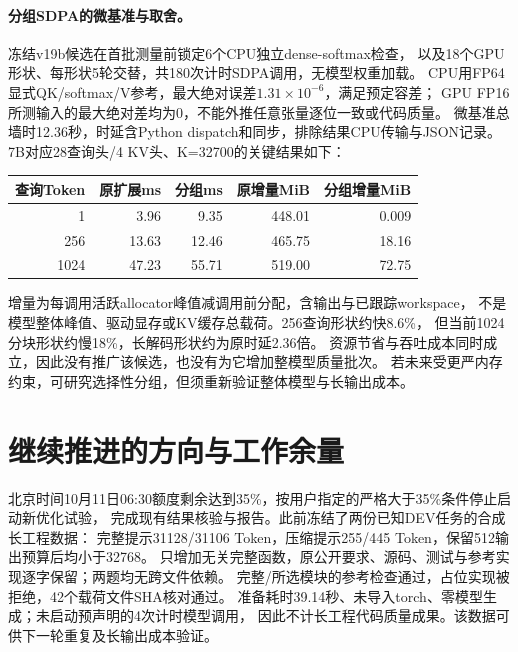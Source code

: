 \documentclass[UTF8,a4paper,11pt,fontset=fandol]{ctexart}
\begin{document}
\paragraph{分组SDPA的微基准与取舍。}
冻结v19b候选在首批测量前锁定6个CPU独立dense-softmax检查，
以及18个GPU形状、每形状5轮交替，共180次计时SDPA调用，无模型权重加载。
CPU用FP64显式QK/softmax/V参考，最大绝对误差$1.31\times10^{-6}$，满足预定容差；
GPU FP16所测输入的最大绝对差均为0，不能外推任意张量逐位一致或代码质量。
微基准总墙时12.36秒，时延含Python dispatch和同步，排除结果CPU传输与JSON记录。
7B对应28查询头/4 KV头、K=32700的关键结果如下：
\begin{center}
\begin{tabular}{rrrrr}
\toprule
查询Token & 原扩展ms & 分组ms & 原增量MiB & 分组增量MiB\\\midrule
1 & 3.96 & 9.35 & 448.01 & 0.009\\
256 & 13.63 & 12.46 & 465.75 & 18.16\\
1024 & 47.23 & 55.71 & 519.00 & 72.75\\\bottomrule
\end{tabular}
\end{center}
增量为每调用活跃allocator峰值减调用前分配，含输出与已跟踪workspace，
不是模型整体峰值、驱动显存或KV缓存总载荷。256查询形状约快8.6\%，
但当前1024分块形状约慢18\%，长解码形状约为原时延2.36倍。
资源节省与吞吐成本同时成立，因此没有推广该候选，也没有为它增加整模型质量批次。
若未来受更严内存约束，可研究选择性分组，但须重新验证整体模型与长输出成本。

\section{继续推进的方向与工作余量}
北京时间10月11日06:30额度剩余达到35\%，按用户指定的严格大于35\%条件停止启动新优化试验，
完成现有结果核验与报告。此前冻结了两份已知DEV任务的合成长工程数据：
完整提示31128/31106 Token，压缩提示255/445 Token，保留512输出预算后均小于32768。
只增加无关完整函数，原公开要求、源码、测试与参考实现逐字保留；两题均无跨文件依赖。
完整/所选模块的参考检查通过，占位实现被拒绝，42个载荷文件SHA核对通过。
准备耗时39.14秒、未导入torch、零模型生成；未启动预声明的4次计时模型调用，
因此不计长工程代码质量成果。该数据可供下一轮重复及长输出成本验证。
\end{document}
